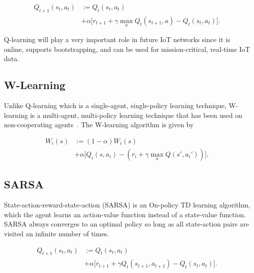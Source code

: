 \documentclass[journal]{IEEEtran}
\begin{document}

\begin{equation}\label{eqn1}
\begin{split}
Q_{t + 1}(s_t, a_t) &:= Q_{t}(s_t, a_t)\\
& + \alpha \Big[ r_{t + 1} + \gamma \max_{a}  Q_{t}(s_{t + 1}, a) -  Q_{t}(s_t, a_t) \Big].
   \end{split}
\end{equation}


Q-learning will play a very important role in future IoT networks since it is online, supports bootstrapping, and can be used for mission-critical, real-time IoT data.

\subsection{W-Learning}
Unlike Q-learning which is a single-agent, single-policy learning technique, W-learning is a multi-agent, multi-policy learning technique that has been used on non-cooperating agents~\cite{Dusparic2009}. The W-learning algorithm is given by

\begin{equation}\label{eqn2}
\begin{split}
W_{i}(s) &:= (1 - \alpha)W_{i}(s) \\
& + \alpha \Big[ Q_{i}(s, a_i)  - (r_i + \gamma \max_{a}  Q(s', a_i')) \Big].
   \end{split}
\end{equation}


\subsection{SARSA}
State-action-reward-state-action (SARSA) is an On-policy TD learning algorithm, which the agent learns an action-value function instead of a state-value function. SARSA always converges to an optimal policy so long as all state-action pairs are visited an infinite number of times.

\begin{equation}\label{eqn3}
\begin{split}
Q_{t + 1}(s_t, a_t) &:= Q_{t}(s_t, a_t)\\
& + \alpha \Big[ r_{t + 1} + \gamma Q_{t}(s_{t + 1}, a_{t + 1}) -  Q_{t}(s_t, a_t) \Big].
   \end{split}
\end{equation}
\end{document}
